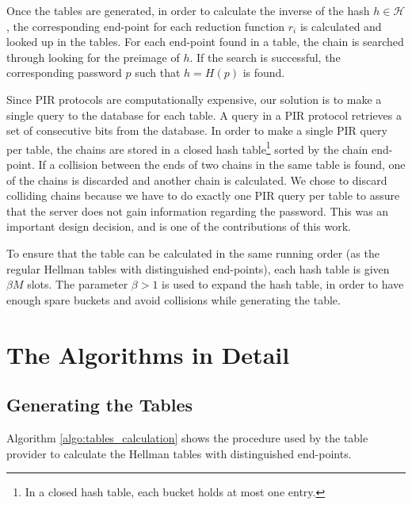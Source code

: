 \documentclass{llncs}
\def \CalH {\mathcal{H}}
\begin{document}
Once the tables are generated, in order to calculate the inverse of
the hash $h \in \CalH$, the corresponding end-point for each reduction function
$r_{i}$ is calculated and looked up in the tables. For each end-point
found in a table, the chain is searched through looking for the preimage of
$h$. If the search is successful, the corresponding password 
$p$ such that $h = H(p)$ is found.

Since PIR protocols are computationally expensive,
our solution is to make a single query to the database for each table. 
A query in a PIR protocol retrieves a set of consecutive bits
from the database. In order to make a single PIR query per table,
the chains are stored in a closed hash table\footnote{In a closed hash table,
each bucket holds at most one entry.}
sorted by the chain end-point.
If a collision between the ends of two chains in the same table
is found, one of the chains is discarded and
another chain is calculated.
We chose to discard colliding chains because
we have to do exactly one PIR query per table to assure
that the server does not gain information regarding the password.
This was an important design decision, and is one of the contributions
of this work.

To ensure that the table can be calculated
in the same running order (as the regular Hellman tables with distinguished
end-points), each hash table is given $\beta M$ slots.
The parameter $\beta > 1$ is used to expand the hash table,
in order to have enough spare buckets and avoid collisions while generating the table.


\section{The Algorithms in Detail} \label{sec:algorithms-detail}


\subsection{Generating the Tables} \label{sec:hash-reversing}

Algorithm \ref{algo:tables_calculation} shows
the procedure used by the table provider to calculate the Hellman
tables with distinguished end-points.
\end{document}
